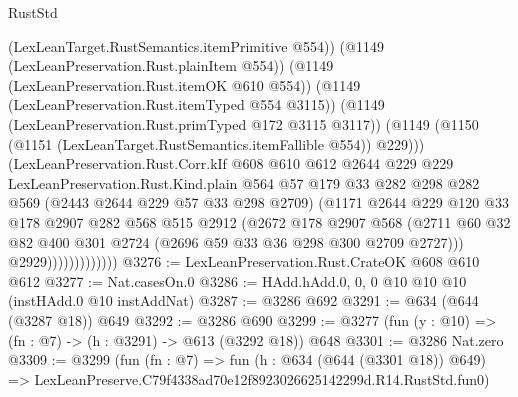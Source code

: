 \begin{lexlean}{RustStd}
\begin{coremodule}
                              (LexLeanTarget.RustSemantics.itemPrimitive @554))
                            (@1149 (LexLeanPreservation.Rust.plainItem @554))
                            (@1149 (LexLeanPreservation.Rust.itemOK @610 @554))
                            (@1149 (LexLeanPreservation.Rust.itemTyped @554 @3115))
                            (@1149 (LexLeanPreservation.Rust.primTyped @172 @3115 @3117))
                            (@1149
                              (@1150 (@1151 (LexLeanTarget.RustSemantics.itemFallible @554)) @229)))
                          (LexLeanPreservation.Rust.Corr.kIf
                            @608
                            @610
                            @612
                            @2644
                            @229
                            @229
                            LexLeanPreservation.Rust.Kind.plain
                            @564
                            @57
                            @179
                            @33
                            @282
                            @298
                            @282
                            @569
                            (@2443 @2644 @229 @57 @33 @298 @2709)
                            (@1171
                              @2644
                              @229
                              @120
                              @33
                              @178
                              @2907
                              @282
                              @568
                              @515
                              @2912
                              (@2672
                                @178
                                @2907
                                @568
                                (@2711
                                  @60
                                  @32
                                  @82
                                  @400
                                  @301
                                  @2724
                                  (@2696 @59 @33 @36 @298 @300 @2709 @2727)))
                              @2929)))))))))))))
@3276 := LexLeanPreservation.Rust.CrateOK @608 @610 @612
@3277 := Nat.casesOn.{0}
@3286 := HAdd.hAdd.{0, 0, 0} @10 @10 @10 (instHAdd.{0} @10 instAddNat)
@3287 := @3286 @692
@3291 := @634 (@644 (@3287 @18)) @649
@3292 := @3286 @690
@3299 := @3277 (fun (y : @10) => (fn : @7) -> (h : @3291) -> @613 (@3292 @18)) @648
@3301 := @3286 Nat.zero
@3309 := @3299
    (fun (fn : @7) =>
    fun (h : @634 (@644 (@3301 @18)) @649) =>
    LexLeanPreserve.C79f4338ad70e12f8923026625142299d.R14.RustStd.fun0)

\end{coremodule}
\end{lexlean}
